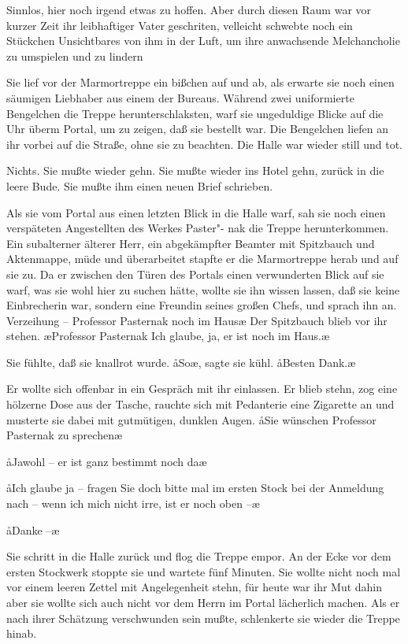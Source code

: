 Sinnlos, hier noch irgend etwas zu hoffen. Aber durch diesen
Raum war vor kurzer Zeit ihr leibhaftiger Vater geschriten,
velleicht schwebte noch ein Stückchen Unsichtbares von ihm
in der Luft, um ihre anwachsende Melchancholie zu umspielen
und zu lindern\frag{}

Sie lief vor der Marmortreppe ein bißchen auf und ab, als
erwarte sie noch einen säumigen Liebhaber aus einem der
Bureaus. Während zwei uniformierte Bengelchen die Treppe
herunterschlaksten, warf sie ungeduldige Blicke auf die Uhr
überm Portal, um zu zeigen, daß sie bestellt war. Die
Bengelchen liefen an ihr vorbei auf die Straße, ohne sie zu
beachten. Die Halle war wieder still und tot.

Nichts. Sie mußte wieder gehn. Sie mußte wieder ins Hotel
gehn, zurück in die leere Bude. Sie mußte ihm einen neuen
Brief schrieben.

Als sie vom Portal aus einen letzten Blick in die Halle warf,
sah sie noch einen verspäteten Angestellten des Werkes Paster"-%
nak die Treppe herunterkommen. Ein subalterner älterer Herr,
ein abgekämpfter Beamter mit Spitzbauch und Aktenmappe,
müde und überarbeitet stapfte er die Marmortreppe herab
und auf sie zu. Da er zwischen den Türen des Portals einen
verwunderten Blick auf sie warf, was sie wohl hier zu suchen
hätte, wollte sie ihn wissen lassen, daß sie keine Einbrecherin
war, sondern eine Freundin seines großen Chefs, und sprach
ihn an. \aanah{}Verzeihung -- Professor Pasternak noch im Haus\frag{}\ae{}
Der Spitzbauch blieb vor ihr stehen. \ae{}Professor Pasternak\frag{}
Ich glaube, ja, er ist noch im Haus.\ae{}

Sie fühlte, daß sie knallrot wurde. \aa{}So\frag{}\ae{}, sagte sie kühl.
\aa{}Besten Dank.\ae{}

Er wollte sich offenbar in ein Gespräch mit ihr einlassen. Er
blieb stehn, zog eine hölzerne Dose aus der Tasche, rauchte
sich mit Pedanterie eine Zigarette an und musterte sie dabei
mit gutmütigen, dunklen Augen. \aa{}Sie wünschen Professor
Pasternak zu sprechen\frag{}\ae{}

\aa{}Jawohl -- er ist ganz bestimmt noch da\frag{}\ae{}

\aa{}Ich glaube ja -- fragen Sie doch bitte mal im ersten Stock bei der
Anmeldung nach -- wenn ich mich nicht irre, ist er noch oben --\ae{}

\aa{}Danke --\ae{}

Sie schritt in die Halle zurück und flog die Treppe empor.
An der Ecke vor dem ersten Stockwerk stoppte sie und wartete
fünf Minuten. Sie wollte nicht noch mal vor einem leeren
Zettel mit \haa{}Angelegenheit\hae{} stehn, für heute war ihr Mut
dahin\dopp{} aber sie wollte sich auch nicht vor dem Herrn im Portal
lächerlich machen. Als er nach ihrer Schätzung verschwunden
sein mußte, schlenkerte sie wieder die Treppe hinab.

